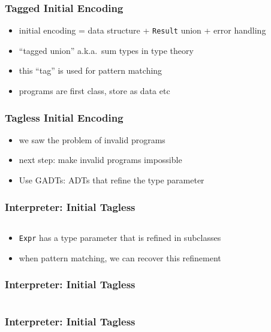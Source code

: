 \documentclass[aspectratio=169, hyperref={colorlinks, linkcolor=beamer@centricgreen}, urlcolor=links]{beamer}
\begin{document}
\begin{frame}
  \frametitle{Tagged Initial Encoding}
  \begin{itemize}
  \item initial encoding = data structure + \texttt{Result} union + error handling
  \item ``tagged union'' a.k.a.\ sum types in type theory
  \item this ``tag'' is used for pattern matching
  \item programs are first class, store as data etc
  \end{itemize}
\end{frame}

\begin{frame}
  \frametitle{Tagless Initial Encoding}
  \begin{itemize}
  \item we saw the problem of invalid programs
  \item next step: make invalid programs impossible
  \item Use GADTs: ADTs that refine the type parameter
  \end{itemize}
\end{frame}

\begin{frame}[fragile]
  \frametitle{Interpreter: Initial Tagless}
  \inputminted[highlightlines={1}, fontsize=\footnotesize]{scala}{snippets/initial-tagless-expr.scala}
  \begin{itemize}
  \item \texttt{Expr} has a type parameter that is refined in subclasses
  \item when pattern matching, we can recover this refinement
  \end{itemize}
\end{frame}

\begin{frame}[fragile]
  \frametitle{Interpreter: Initial Tagless}
  \inputminted[fontsize=\footnotesize]{scala}{snippets/initial-tagless-sample.scala}
\end{frame}

\begin{frame}[fragile,t]
  \frametitle{Interpreter: Initial Tagless}
  \inputminted[fontsize=\footnotesize]{scala}{snippets/initial-tagless-interp.scala}
  \vspace{5mm}
\end{frame}
\end{document}
